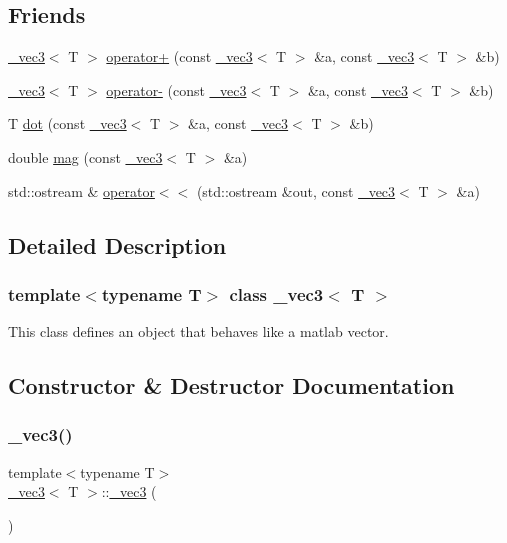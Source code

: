\subsection*{Friends}
\begin{DoxyCompactItemize}
\item 
\hyperlink{class__vec3}{\+\_\+vec3}$<$ T $>$ \hyperlink{class__vec3_a1b8322c801946f486a2f45e42249fc46}{operator+} (const \hyperlink{class__vec3}{\+\_\+vec3}$<$ T $>$ \&a, const \hyperlink{class__vec3}{\+\_\+vec3}$<$ T $>$ \&b)
\item 
\hyperlink{class__vec3}{\+\_\+vec3}$<$ T $>$ \hyperlink{class__vec3_aecdf47bd765b987f184e062d09c16734}{operator-\/} (const \hyperlink{class__vec3}{\+\_\+vec3}$<$ T $>$ \&a, const \hyperlink{class__vec3}{\+\_\+vec3}$<$ T $>$ \&b)
\item 
T \hyperlink{class__vec3_a9660915089ddf52a1798ea286b791df4}{dot} (const \hyperlink{class__vec3}{\+\_\+vec3}$<$ T $>$ \&a, const \hyperlink{class__vec3}{\+\_\+vec3}$<$ T $>$ \&b)
\item 
double \hyperlink{class__vec3_af97e6c6a1941f3e6f25d630a814f162b}{mag} (const \hyperlink{class__vec3}{\+\_\+vec3}$<$ T $>$ \&a)
\item 
std\+::ostream \& \hyperlink{class__vec3_a06648065995e22b2f6bdda8e9e32ab85}{operator$<$$<$} (std\+::ostream \&out, const \hyperlink{class__vec3}{\+\_\+vec3}$<$ T $>$ \&a)
\end{DoxyCompactItemize}


\subsection{Detailed Description}
\subsubsection*{template$<$typename T$>$\newline
class \+\_\+vec3$<$ T $>$}

This class defines an object that behaves like a matlab vector. 

\subsection{Constructor \& Destructor Documentation}
\mbox{\label{class__vec3_a6d4f886401b1bba2ca49a2918c2ad5dc}} 
\subsubsection{\texorpdfstring{\+\_\+vec3()}{\_vec3()}\hspace{0.1cm}{\footnotesize\ttfamily [1/2]}}
{\footnotesize\ttfamily template$<$typename T$>$ \\
\hyperlink{class__vec3}{\+\_\+vec3}$<$ T $>$\+::\hyperlink{class__vec3}{\+\_\+vec3} (\begin{DoxyParamCaption}{ }\end{DoxyParamCaption})\hspace{0.3cm}{\ttfamily [inline]}}

